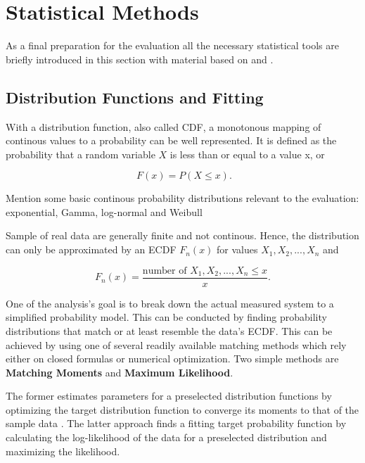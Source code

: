 \section{Statistical Methods}

As a final preparation for the evaluation all the necessary statistical tools are briefly introduced in this section with material based on \cite{field2012discovering} and \cite{Knuth:1997:ACP:270146}.



\subsection{Distribution Functions and Fitting}

With a distribution function, also called \gls{CDF}, a monotonous mapping of continous values to a probability can be well represented. It is defined as the probability that a random variable $X$ is less than or equal to a value x, or

\begin{equation}
\phantom{.} F(x) = P(X\leq x)\text{.}
\end{equation}

Mention some basic continous probability distributions relevant to the evaluation: exponential, Gamma, log-normal and Weibull

Sample of real data are generally finite and not continous. Hence, the distribution can only be approximated by an \gls{ECDF} $F_n(x)$ for values $X_1, X_2, ... , X_n$ and 

\begin{equation}
F_n(x) = \frac{\text{number of }X_1, X_2, ... , X_n \leq x}{x}\text{.}
\end{equation}


One of the analysis's goal is to break down the actual measured system to a simplified probability model. This can be conducted by finding probability distributions that match or at least resemble the data's \gls{ECDF}. This can be achieved by using one of several readily available matching methods which rely either on closed formulas or numerical optimization. Two simple methods are \textbf{Matching Moments} and \textbf{Maximum Likelihood}.

The former estimates parameters for a preselected distribution functions by optimizing the target distribution function to converge its moments to that of the sample data  \cite[pp.~99-143]{vose2000risk}. The latter approach finds a fitting target probability function by calculating the log-likelihood of the data for a preselected distribution and maximizing the likelihood.

